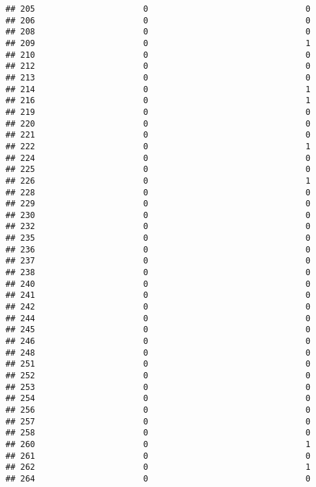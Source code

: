 \documentclass[
]{article}
\begin{document}
\begin{verbatim}
## 205                      0                                0
## 206                      0                                0
## 208                      0                                0
## 209                      0                                1
## 210                      0                                0
## 212                      0                                0
## 213                      0                                0
## 214                      0                                1
## 216                      0                                1
## 219                      0                                0
## 220                      0                                0
## 221                      0                                0
## 222                      0                                1
## 224                      0                                0
## 225                      0                                0
## 226                      0                                1
## 228                      0                                0
## 229                      0                                0
## 230                      0                                0
## 232                      0                                0
## 235                      0                                0
## 236                      0                                0
## 237                      0                                0
## 238                      0                                0
## 240                      0                                0
## 241                      0                                0
## 242                      0                                0
## 244                      0                                0
## 245                      0                                0
## 246                      0                                0
## 248                      0                                0
## 251                      0                                0
## 252                      0                                0
## 253                      0                                0
## 254                      0                                0
## 256                      0                                0
## 257                      0                                0
## 258                      0                                0
## 260                      0                                1
## 261                      0                                0
## 262                      0                                1
## 264                      0                                0

\end{verbatim}
\end{document}
